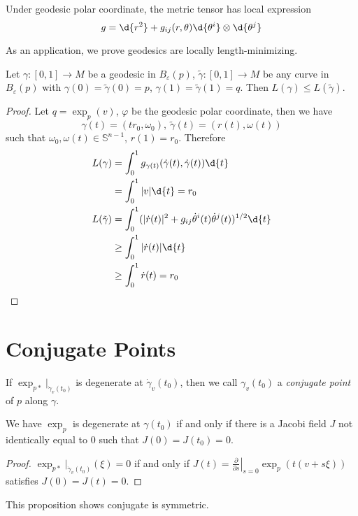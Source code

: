 \begin{cor}
    Under geodesic polar coordinate, the metric tensor has local expression
    \[g=\d{r^2}+g_{ij}(r,\theta)\d{\theta^i}\otimes\d{\theta^j}\]
\end{cor}

As an application, we prove geodesics are locally length-minimizing.
\begin{prop}\label{locally length-min}
    Let $\gamma:[0,1]\to M$ be a geodesic in $B_\varepsilon(p)$, $\tilde{\gamma}:[0,1]\to M$ be any curve in $B_\varepsilon(p)$ with $\gamma(0)=\tilde{\gamma}(0)=p$, $\gamma(1)=\tilde{\gamma}(1)=q$.
    Then $L(\gamma)\leq L(\tilde{\gamma})$.
\end{prop}
\begin{proof}
    Let $q=\exp_p(v)$, $\varphi$ be the geodesic polar coordinate, then we have
    \[\gamma(t)=(tr_0,\omega_0),\ \tilde{\gamma}(t)=(r(t),\omega(t))\]
    such that $\omega_0,\omega(t)\in\mathbb{S}^{n-1}$, $r(1)=r_0$.
    Therefore
    \begin{align*}
        L(\gamma)&=\int_0^1g_{\gamma(t)}(\dot{\gamma}(t),\dot{\gamma}(t))\d{t}\\
        &=\int_0^1|v|\d{t}=r_0\\
        L(\tilde{\gamma})&=\int_0^1(|\dot{r}(t)|^2+g_{ij}\dot{\theta}^i(t)\dot{\theta}^j(t))^{1/2}\d{t}\\
        &\geq\int_0^1|\dot{r}(t)|\d{t}\\
        &\geq\int_0^1\dot{r}(t)=r_0\qedhere
    \end{align*}
\end{proof}

\section{Conjugate Points}

\begin{defn}
    If $\exp_{p*}|_{\dot{\gamma}_v(t_0)}$ is degenerate at $\dot{\gamma}_v(t_0)$, then we call $\gamma_v(t_0)$ a \emph{conjugate point} of $p$ along $\gamma$.
\end{defn}

\begin{prop}
    We have $\exp_p$ is degenerate at $\gamma(t_0)$ if and only if there is a Jacobi field $J$ not identically equal to $0$ such that $J(0)=J(t_0)=0$.
\end{prop}
\begin{proof}
    $\exp_{p*}|_{\dot{\gamma}_v(t_0)}(\xi)=0$ if and only if $J(t)=\left.\frac{\partial{}}{\partial{s}}\right|_{s=0}\exp_p(t(v+s\xi))$ satisfies $J(0)=J(t)=0$.
\end{proof}

\begin{rem}
    This proposition shows conjugate is symmetric.
\end{rem}